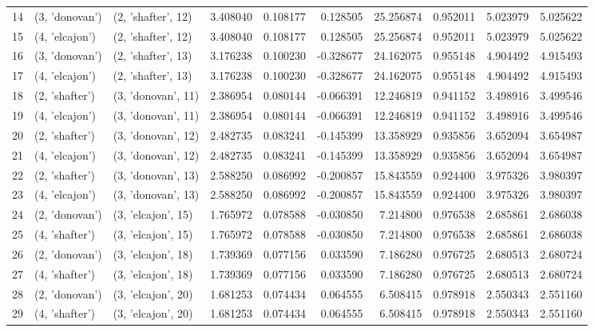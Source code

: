 \begin{tabular}{lllrrrrrrr}
14 &   (3, 'donovan') &  (2, 'shafter', 12) &  3.408040 &  0.108177 &  0.128505 &  25.256874 &  0.952011 &  5.023979 &  5.025622 \\
15 &   (4, 'elcajon') &  (2, 'shafter', 12) &  3.408040 &  0.108177 &  0.128505 &  25.256874 &  0.952011 &  5.023979 &  5.025622 \\
16 &   (3, 'donovan') &  (2, 'shafter', 13) &  3.176238 &  0.100230 & -0.328677 &  24.162075 &  0.955148 &  4.904492 &  4.915493 \\
17 &   (4, 'elcajon') &  (2, 'shafter', 13) &  3.176238 &  0.100230 & -0.328677 &  24.162075 &  0.955148 &  4.904492 &  4.915493 \\
18 &   (2, 'shafter') &  (3, 'donovan', 11) &  2.386954 &  0.080144 & -0.066391 &  12.246819 &  0.941152 &  3.498916 &  3.499546 \\
19 &   (4, 'elcajon') &  (3, 'donovan', 11) &  2.386954 &  0.080144 & -0.066391 &  12.246819 &  0.941152 &  3.498916 &  3.499546 \\
20 &   (2, 'shafter') &  (3, 'donovan', 12) &  2.482735 &  0.083241 & -0.145399 &  13.358929 &  0.935856 &  3.652094 &  3.654987 \\
21 &   (4, 'elcajon') &  (3, 'donovan', 12) &  2.482735 &  0.083241 & -0.145399 &  13.358929 &  0.935856 &  3.652094 &  3.654987 \\
22 &   (2, 'shafter') &  (3, 'donovan', 13) &  2.588250 &  0.086992 & -0.200857 &  15.843559 &  0.924400 &  3.975326 &  3.980397 \\
23 &   (4, 'elcajon') &  (3, 'donovan', 13) &  2.588250 &  0.086992 & -0.200857 &  15.843559 &  0.924400 &  3.975326 &  3.980397 \\
24 &   (2, 'donovan') &  (3, 'elcajon', 15) &  1.765972 &  0.078588 & -0.030850 &   7.214800 &  0.976538 &  2.685861 &  2.686038 \\
25 &   (4, 'shafter') &  (3, 'elcajon', 15) &  1.765972 &  0.078588 & -0.030850 &   7.214800 &  0.976538 &  2.685861 &  2.686038 \\
26 &   (2, 'donovan') &  (3, 'elcajon', 18) &  1.739369 &  0.077156 &  0.033590 &   7.186280 &  0.976725 &  2.680513 &  2.680724 \\
27 &   (4, 'shafter') &  (3, 'elcajon', 18) &  1.739369 &  0.077156 &  0.033590 &   7.186280 &  0.976725 &  2.680513 &  2.680724 \\
28 &   (2, 'donovan') &  (3, 'elcajon', 20) &  1.681253 &  0.074434 &  0.064555 &   6.508415 &  0.978918 &  2.550343 &  2.551160 \\
29 &   (4, 'shafter') &  (3, 'elcajon', 20) &  1.681253 &  0.074434 &  0.064555 &   6.508415 &  0.978918 &  2.550343 &  2.551160 \\

\end{tabular}
